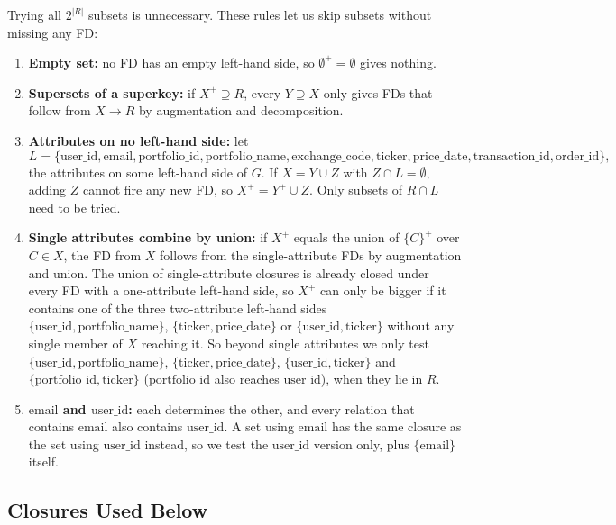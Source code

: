 \documentclass{article}
\newcommand{\at}[1]{\text{#1}}
\begin{document}
Trying all $2^{|R|}$ subsets is unnecessary. These rules let us skip subsets without missing any FD:
\begin{enumerate}[label=(R\arabic*), leftmargin=*]
  \item \textbf{Empty set:} no FD has an empty left-hand side, so $\emptyset^+ = \emptyset$ gives nothing.
  \item \textbf{Supersets of a superkey:} if $X^+ \supseteq R$, every $Y \supseteq X$ only gives FDs that follow from $X \rightarrow R$ by augmentation and decomposition.
  \item \textbf{Attributes on no left-hand side:} let
  \[ L = \{\at{user\_id}, \at{email}, \at{portfolio\_id}, \at{portfolio\_name}, \at{exchange\_code}, \at{ticker}, \at{price\_date}, \at{transaction\_id}, \at{order\_id}\}, \]
  the attributes on some left-hand side of $G$. If $X = Y \cup Z$ with $Z \cap L = \emptyset$, adding $Z$ cannot fire any new FD, so $X^+ = Y^+ \cup Z$. Only subsets of $R \cap L$ need to be tried.
  \item \textbf{Single attributes combine by union:} if $X^+$ equals the union of $\{C\}^+$ over $C \in X$, the FD from $X$ follows from the single-attribute FDs by augmentation and union. The union of single-attribute closures is already closed under every FD with a one-attribute left-hand side, so $X^+$ can only be bigger if it contains one of the three two-attribute left-hand sides $\{\at{user\_id}, \at{portfolio\_name}\}$, $\{\at{ticker}, \at{price\_date}\}$ or $\{\at{user\_id}, \at{ticker}\}$ without any single member of $X$ reaching it. So beyond single attributes we only test $\{\at{user\_id}, \at{portfolio\_name}\}$, $\{\at{ticker}, \at{price\_date}\}$, $\{\at{user\_id}, \at{ticker}\}$ and $\{\at{portfolio\_id}, \at{ticker}\}$ ($\at{portfolio\_id}$ also reaches $\at{user\_id}$), when they lie in $R$.
  \item \textbf{$\at{email}$ and $\at{user\_id}$:} each determines the other, and every relation that contains $\at{email}$ also contains $\at{user\_id}$. A set using $\at{email}$ has the same closure as the set using $\at{user\_id}$ instead, so we test the $\at{user\_id}$ version only, plus $\{\at{email}\}$ itself.
\end{enumerate}

\subsection*{Closures Used Below}
\end{document}
